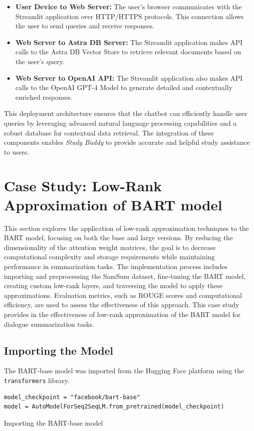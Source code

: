 \begin{itemize}
    \item \textbf{User Device to Web Server:} The user's browser communicates with the Streamlit application over HTTP/HTTPS protocols. This connection allows the user to send queries and receive responses.
    \item \textbf{Web Server to Astra DB Server:} The Streamlit application makes API calls to the Astra DB Vector Store to retrieve relevant documents based on the user's query.
    \item \textbf{Web Server to OpenAI API:} The Streamlit application also makes API calls to the OpenAI GPT-4 Model to generate detailed and contextually enriched responses.
\end{itemize}

This deployment architecture ensures that the chatbot can efficiently handle user queries by leveraging advanced natural language processing capabilities and a robust database for contextual data retrieval. The integration of these components enables \textit{Study Buddy} to provide accurate and helpful study assistance to users.

\section{Case Study: Low-Rank Approximation of BART model}
This section explores the application of low-rank approximation techniques to the BART model, focusing on both the base and large versions. By reducing the dimensionality of the attention weight matrices, the goal is to decrease computational complexity and storage requirements while maintaining performance in summarization tasks. The implementation process includes importing and preprocessing the SamSum dataset, fine-tuning the BART model, creating custom low-rank layers, and traversing the model to apply these approximations. Evaluation metrics, such as ROUGE scores and computational efficiency, are used to assess the effectiveness of this approach. This case study provides in the effectiveness of low-rank approximation of the BART model for dialogue summarization tasks.

    \subsection{Importing the Model}
        The BART-base model was imported from the Hugging Face platform using the \texttt{transformers} library.
        \begin{listing}[H]
            \begin{verbatim}
model_checkpoint = "facebook/bart-base"
model = AutoModelForSeq2SeqLM.from_pretrained(model_checkpoint)
            \end{verbatim}
            \caption{Importing the BART-base model}
            \label{listing:Importing_BART}
        \end{listing}
    
